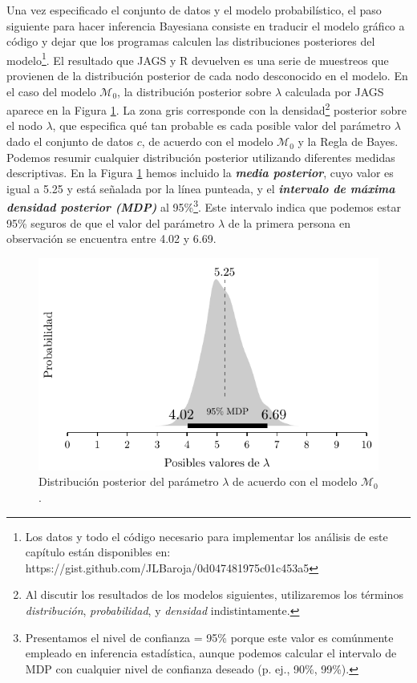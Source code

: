 \documentclass{article}
\begin{document}
\indent Una vez especificado el conjunto de datos y el modelo probabilístico, el paso siguiente para hacer inferencia Bayesiana consiste en traducir el modelo gráfico a código y dejar que los programas calculen las distribuciones posteriores del modelo\footnote{Los datos y todo el código necesario para implementar los análisis de este capítulo están disponibles en: https://gist.github.com/JLBaroja/0d047481975c01c453a5}. El resultado que JAGS y R devuelven es una serie de muestreos que provienen de la distribución posterior de cada nodo desconocido en el modelo. En el caso del modelo $\mathcal M_0$, la distribución posterior sobre $\lambda$ calculada por JAGS aparece en la Figura \ref{fig:lambda_m0}. La zona gris corresponde con la densidad\footnote{Al discutir los resultados de los modelos siguientes, utilizaremos los términos \emph{distribución}, \emph{probabilidad}, y \emph{densidad} indistintamente.} posterior sobre el nodo $\lambda$, que especifica qué tan probable es cada posible valor del parámetro $\lambda$ dado el conjunto de datos $c$, de acuerdo con el modelo $\mathcal M_0$ y la Regla de Bayes. Podemos resumir cualquier distribución posterior utilizando diferentes medidas descriptivas. En la Figura \ref{fig:lambda_m0} hemos incluido la \emph{\textbf{media posterior}}, cuyo valor es igual a 5.25 y está señalada por la línea punteada, y el \emph{\textbf{intervalo de máxima densidad posterior (MDP)}} al 95\%\footnote{Presentamos el nivel de confianza = 95\% porque este valor es comúnmente empleado en inferencia estadística, aunque podemos calcular el intervalo de MDP con cualquier nivel de confianza deseado (p. ej., 90\%, 99\%).}. Este intervalo indica que podemos estar 95\% seguros de que el valor del parámetro $\lambda$ de la primera persona en observación se encuentra entre 4.02 y 6.69.

\begin{figure}[H]
\centerline{\includegraphics[width=1\textwidth]{lambda_m0.pdf}}
\caption{Distribución posterior del parámetro $\lambda$ de acuerdo con el modelo $\mathcal M_0$.}
\label{fig:lambda_m0}
\end{figure}
\end{document}

